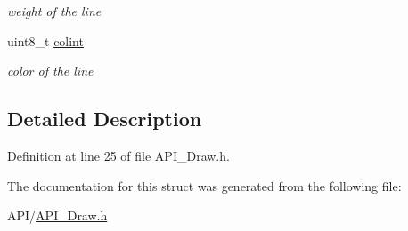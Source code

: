 \begin{DoxyCompactItemize}
\begin{DoxyCompactList}\small\item\em weight of the line \end{DoxyCompactList}\item 
\mbox{\label{struct_l_i_n_e_a21caa4b27a71b7967f1a2d64f196a674}} 
uint8\+\_\+t \hyperlink{struct_l_i_n_e_a21caa4b27a71b7967f1a2d64f196a674}{colint}
\begin{DoxyCompactList}\small\item\em color of the line \end{DoxyCompactList}\end{DoxyCompactItemize}


\subsection{Detailed Description}


Definition at line 25 of file A\+P\+I\+\_\+\+Draw.\+h.



The documentation for this struct was generated from the following file\+:\begin{DoxyCompactItemize}
\item 
A\+P\+I/\hyperlink{_a_p_i___draw_8h}{A\+P\+I\+\_\+\+Draw.\+h}\end{DoxyCompactItemize}
